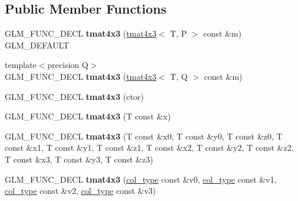 \subsection*{Public Member Functions}
\begin{DoxyCompactItemize}
\item 
\hypertarget{structglm_1_1tmat4x3_a5741733ec73d12a93fd1088965fb0523}{G\-L\-M\-\_\-\-F\-U\-N\-C\-\_\-\-D\-E\-C\-L {\bfseries tmat4x3} (\hyperlink{structglm_1_1tmat4x3}{tmat4x3}$<$ T, P $>$ const \&m) G\-L\-M\-\_\-\-D\-E\-F\-A\-U\-L\-T}\label{structglm_1_1tmat4x3_a5741733ec73d12a93fd1088965fb0523}

\item 
\hypertarget{structglm_1_1tmat4x3_a1dadd893a6f4303c828c1703c01b6a82}{{\footnotesize template$<$precision Q$>$ }\\G\-L\-M\-\_\-\-F\-U\-N\-C\-\_\-\-D\-E\-C\-L {\bfseries tmat4x3} (\hyperlink{structglm_1_1tmat4x3}{tmat4x3}$<$ T, Q $>$ const \&m)}\label{structglm_1_1tmat4x3_a1dadd893a6f4303c828c1703c01b6a82}

\item 
\hypertarget{structglm_1_1tmat4x3_adf10a53f745b379317bf54997fdf59e6}{G\-L\-M\-\_\-\-F\-U\-N\-C\-\_\-\-D\-E\-C\-L {\bfseries tmat4x3} (ctor)}\label{structglm_1_1tmat4x3_adf10a53f745b379317bf54997fdf59e6}

\item 
\hypertarget{structglm_1_1tmat4x3_ac334fddfc2ee55301365a3dba5919e06}{G\-L\-M\-\_\-\-F\-U\-N\-C\-\_\-\-D\-E\-C\-L {\bfseries tmat4x3} (T const \&x)}\label{structglm_1_1tmat4x3_ac334fddfc2ee55301365a3dba5919e06}

\item 
\hypertarget{structglm_1_1tmat4x3_ac85a3693a2bef96d65be77e76c70acdb}{G\-L\-M\-\_\-\-F\-U\-N\-C\-\_\-\-D\-E\-C\-L {\bfseries tmat4x3} (T const \&x0, T const \&y0, T const \&z0, T const \&x1, T const \&y1, T const \&z1, T const \&x2, T const \&y2, T const \&z2, T const \&x3, T const \&y3, T const \&z3)}\label{structglm_1_1tmat4x3_ac85a3693a2bef96d65be77e76c70acdb}

\item 
\hypertarget{structglm_1_1tmat4x3_acc604d134635bd3f611a8201cacd79c5}{G\-L\-M\-\_\-\-F\-U\-N\-C\-\_\-\-D\-E\-C\-L {\bfseries tmat4x3} (\hyperlink{structglm_1_1tvec3}{col\-\_\-type} const \&v0, \hyperlink{structglm_1_1tvec3}{col\-\_\-type} const \&v1, \hyperlink{structglm_1_1tvec3}{col\-\_\-type} const \&v2, \hyperlink{structglm_1_1tvec3}{col\-\_\-type} const \&v3)}\label{structglm_1_1tmat4x3_acc604d134635bd3f611a8201cacd79c5}


\end{DoxyCompactItemize}
